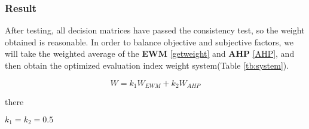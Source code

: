 \documentclass[12pt]{article}
\begin{document}
	
	\subsubsection{Result}
	After testing, all decision matrices have passed the consistency test, so the weight obtained is reasonable. In order to balance objective and subjective factors, we will take the weighted average of the \textbf{EWM} \eqref{getweight} and \textbf{AHP} \eqref{AHP}, and then obtain the optimized evaluation index weight system(Table \ref{tb:system}).
	
	\begin{equation}\label{}
		W = k_{1}W_{EWM} + k_{2}W_{AHP}
	\end{equation}
	
	there
	
	\qquad $k_{1}=k_{2}=0.5$
	
\end{document}

